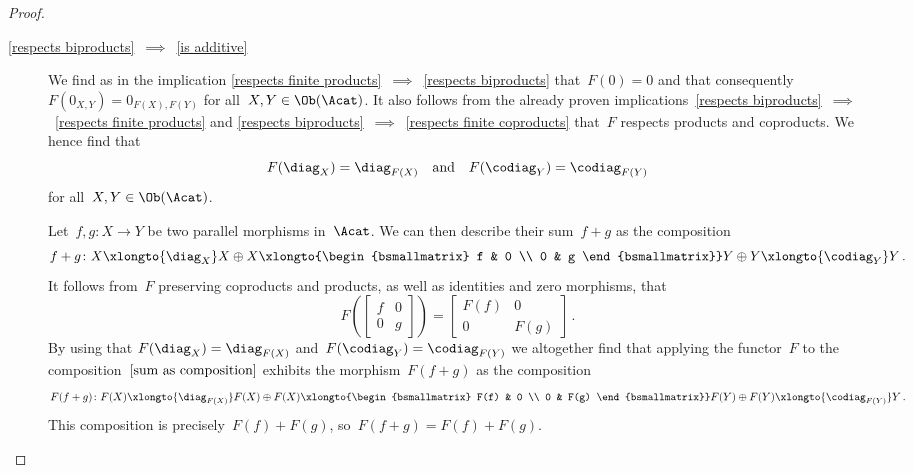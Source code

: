 \begin{proof}
\begin{enumerate}
\begin{description}
        \item[\ref*{respects biproducts}~$\implies$~\ref*{is additive}]
          We find as in the implication \ref*{respects finite products}~$\implies$~\ref*{respects biproducts} that~$F(0) = 0$ and that consequently~$F(0_{X,Y}) =  0_{F(X), F(Y)}$ for all~$X, Y \in \Ob(\Acat)$.
          It also follows from the already proven implications~\ref*{respects biproducts}~$\implies$~\ref*{respects finite products} and \ref*{respects biproducts}~$\implies$~\ref*{respects finite coproducts} that~$F$ respects products and coproducts.
          We hence find that
          \[
              F(\diag_X)
            = \diag_{F(X)}
            \quad\text{and}\quad
              F(\codiag_Y)
            = \codiag_{F(Y)}
          \]
          for all~$X, Y \in \Ob(\Acat)$.
          
          Let~$f, g \colon X \to Y$ be two parallel morphisms in~$\Acat$.
          We can then describe their sum~$f+g$ as the composition
          \begin{equation}
            \label{sum as composition}
              f+g
            \colon
              X
            \xlongto{\diag_X}
              X \oplus X
            \xlongto{\begin{bsmallmatrix} f & 0 \\ 0 & g \end{bsmallmatrix}}
              Y \oplus Y
            \xlongto{\codiag_Y}
              Y \,.
          \end{equation}
          It follows from~$F$ preserving coproducts and products, as well as identities and zero morphisms, that
          \[
            F
            \left(
              \begin{bmatrix}
                f & 0 \\
                0 & g
              \end{bmatrix}
            \right)
            =
            \begin{bmatrix}
              F(f)  & 0     \\
              0     & F(g)
            \end{bmatrix} \,.
          \]
          By using that $F(\diag_X) = \diag_{F(X)}$ and~$F(\codiag_Y) = \codiag_{F(Y)}$ we altogether find that applying the functor~$F$ to the composition~$\eqref{sum as composition}$ exhibits the morphism~$F(f+g)$ as the composition
          \[
              F(f+g)
            \colon
              F(X)
            \xlongto{\diag_{F(X)}}
              F(X) \oplus F(X)
            \xlongto{\begin{bsmallmatrix} F(f) & 0 \\ 0 & F(g) \end{bsmallmatrix}}
              F(Y) \oplus F(Y)
            \xlongto{\codiag_{F(Y)}}
              Y \,.
          \]
          This composition is precisely~$F(f) + F(g)$, so~$F(f + g) = F(f) + F(g)$.
        \qedhere
      \end{description}
  \end{enumerate}
\end{proof}




